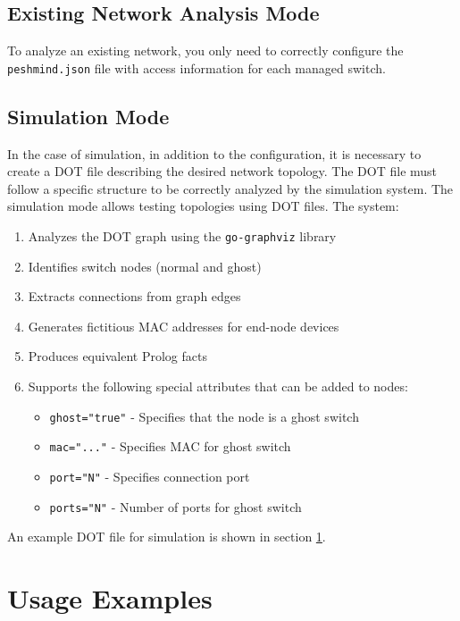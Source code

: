 \documentclass[12pt,a4paper]{article}
\begin{document}
\subsection{Existing Network Analysis Mode}
To analyze an existing network, you only need to correctly configure the \texttt{peshmind.json} file 
with access information for each managed switch.

\subsection{Simulation Mode}

In the case of simulation, in addition to the configuration, it is necessary to create a DOT file describing the desired
network topology. The DOT file must follow a specific structure to be correctly analyzed by the simulation
system.
The simulation mode allows testing topologies using DOT files. The system:

\begin{enumerate}
    \item Analyzes the DOT graph using the \texttt{go-graphviz} library
    \item Identifies switch nodes (normal and ghost)
    \item Extracts connections from graph edges
    \item Generates fictitious MAC addresses for end-node devices
    \item Produces equivalent Prolog facts
    \item Supports the following special attributes that can be added to nodes:
    \begin{itemize}
        \item \texttt{ghost="true"} - Specifies that the node is a ghost switch
        \item \texttt{mac="..."} - Specifies MAC for ghost switch
        \item \texttt{port="N"} - Specifies connection port
        \item \texttt{ports="N"} - Number of ports for ghost switch
    \end{itemize}
\end{enumerate}

An example DOT file for simulation is shown in section \ref{sec:examples}.

\section{Usage Examples}
\label{sec:examples}
\end{document}
